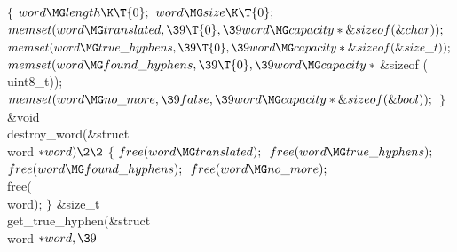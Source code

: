 ${}\{{}$\1\6
${}\\{word}\MG\\{length}\K\T{0};{}$\6
${}\\{word}\MG\\{size}\K\T{0};{}$\6
${}\\{memset}(\\{word}\MG\\{translated},\39\T{0},\39\\{word}\MG\\{capacity}*%
\&{sizeof}(\&{char}));{}$\6
${}\\{memset}(\\{word}\MG\\{true\_hyphens},\39\T{0},\39\\{word}\MG\\{capacity}*%
\&{sizeof}(\&{size\_t}));{}$\6
${}\\{memset}(\\{word}\MG\\{found\_hyphens},\39\T{0},\39\\{word}\MG%
\\{capacity}*{}$\&{sizeof} (\\{uint8\_t}));\6
${}\\{memset}(\\{word}\MG\\{no\_more},\39\\{false},\39\\{word}\MG\\{capacity}*%
\&{sizeof}(\&{bool}));{}$\6
\4${}\}{}$\2\7
\1\1\&{void} \\{destroy\_word}(\&{struct} \\{word} ${}{*}\\{word})\2\2{}$\6
${}\{{}$\1\6
${}\\{free}(\\{word}\MG\\{translated});{}$\6
${}\\{free}(\\{word}\MG\\{true\_hyphens});{}$\6
${}\\{free}(\\{word}\MG\\{found\_hyphens});{}$\6
${}\\{free}(\\{word}\MG\\{no\_more});{}$\6
\\{free}(\\{word});\6
\4${}\}{}$\2\7
\1\1\&{size\_t} \\{get\_true\_hyphen}(\&{struct} \\{word} ${}{*}\\{word},\39{}$%
